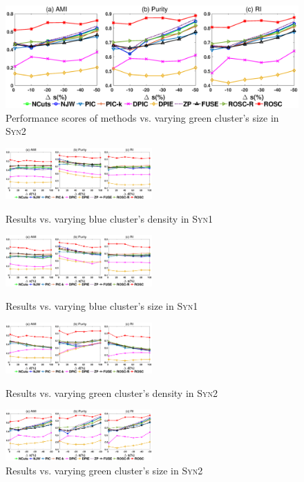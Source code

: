 {\begin{figure}[!htbp]
        \label{figure:syn3_d}
    \centering
        \includegraphics[width =0.7\linewidth]{figure/syn3_s_1.eps}
        \vspace{-0.5cm}
        \caption{Performance scores of methods vs. varying green cluster's size in \textsc{Syn2}}
        \label{figure:syn3_s}
\end{figure}
}

\begin{figure}[!htbp]
        \centering
        \includegraphics[width=0.5\textwidth]{figure/syn2_d_1.eps}
        \vspace{-0.5cm}
        \caption{Results vs. varying blue cluster's density in \textsc{Syn1}}
        \label{figure:syn2_d}
         \centering
         \vspace{0.2cm}
        \includegraphics[width=0.5\textwidth]{figure/syn2_s_1.eps}
        \vspace{-0.5cm}
        \caption{Results vs. varying blue cluster's size in \textsc{Syn1}}
        \label{figure:syn2_s}
         \centering
         \vspace{0.2cm}
        \includegraphics[width=0.5\textwidth]{figure/syn3_d_1.eps}
        \vspace{-0.5cm}
        \caption{Results vs. varying green cluster's density in \textsc{Syn2}}
        \label{figure:syn3_d}
         \centering
         \vspace{0.2cm}
        \includegraphics[width=0.5\textwidth]{figure/syn3_s_1.eps}
        \vspace{-0.5cm}
    \caption{Results vs. varying green cluster's size in \textsc{Syn2}}
     \label{figure:syn3_s}
     \vspace{-5mm}
\end{figure}



